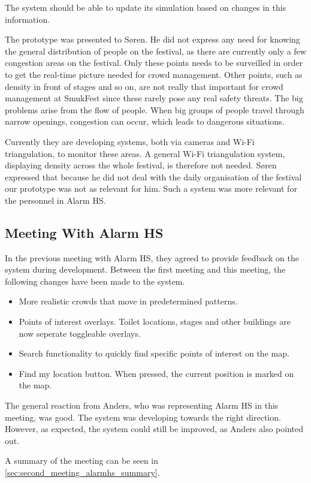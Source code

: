 The system should be able to update its simulation based on changes in this information.

The prototype was presented to Søren. He did not express any need for knowing the general distribution of people on the festival, as there are currently only a few congestion areas on the festival. Only these points needs to be surveilled in order to get the real-time picture needed for crowd management. Other points, such as density in front of stages and so on, are not really that important for crowd management at SmukFest since these rarely pose any real safety threats. The big problems arise from the flow of people. When big groups of people travel through narrow openings, congestion can occur, which leads to dangerous situations.

Currently they are developing systems, both via cameras and Wi-Fi triangulation, to monitor these areas. A general Wi-Fi triangulation system, displaying density across the whole festival, is therefore not needed. Søren expressed that because he did not deal with the daily organisation of the festival our prototype was not as relevant for him. Such a system was more relevant for the personnel in Alarm HS.


\subsection{Meeting With Alarm HS}

In the previous meeting with Alarm HS, they agreed to provide feedback on the system during development. Between the first meeting and this meeting, the following changes have been made to the system.

\begin{itemize}
    \item More realistic crowds that move in predetermined patterns.
    \item Points of interest overlays. Toilet locations, stages and other buildings are now seperate toggleable overlays.
    \item Search functionality to quickly find specific points of interest on the map.
    \item Find my location button. When pressed, the current position is marked on the map.
\end{itemize}

The general reaction from Anders, who was representing Alarm HS in this meeting, was good. The system was developing towards the right direction. However, as expected, the system could still be improved, as Anders also pointed out.

A summary of the meeting can be seen in \cref{sec:second_meeting_alarmhs_summary}.